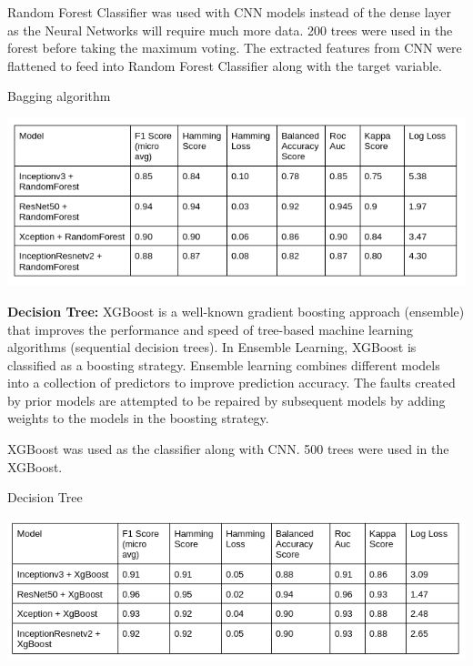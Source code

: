 \documentclass[sigconf]{acmart}
\begin{document}
Random Forest Classifier was used with CNN models instead of the dense layer as the Neural Networks will require much more data. 200 trees were used in the forest before taking the maximum voting. The extracted features from CNN were flattened to feed into Random Forest Classifier along with the target variable.\\
\begin{table}[h]
  \centering
   \caption{Bagging algorithm}
  \includegraphics[width=\linewidth]{../supplements/baggingalgorithm.png}
 
  \label{Tab.5}
\end{table}
\textbf{Decision Tree:}
XGBoost is a well-known gradient boosting approach (ensemble) that improves the performance and speed of tree-based machine learning algorithms (sequential decision trees). In Ensemble Learning, XGBoost is classified as a boosting strategy. Ensemble learning combines different models into a collection of predictors to improve prediction accuracy. The faults created by prior models are attempted to be repaired by subsequent models by adding weights to the models in the boosting strategy.

XGBoost was used as the classifier along with CNN. 500 trees were used in the XGBoost. 
\begin{table}[h]
  \centering
   \caption{Decision Tree}
  \includegraphics[width=\linewidth]{../supplements/decission tree.png}
 
  \label{Tab.6}
\end{table}
\end{document}
